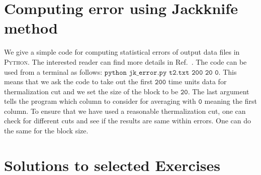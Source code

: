 \documentclass[letter,11pt]{article}
\newcommand{\PY}{\textsc{Python}}
\begin{document}
\section{\label{sec:jk_code}Computing error using Jackknife method}

We give a simple code for computing statistical errors of output data files in \PY. The interested reader can find more details in Ref.~\cite{2012arXiv1210.3781Y}. The code can be used from a terminal as follows: 
$\texttt{python jk\_error.py t2.txt 200 20 0}$. 
This means that we ask the code to take out the first $\texttt{200}$ time units data for thermalization cut and we set the size of the block to be $\texttt{20}$. The last argument tells the program which column to consider for averaging with $\texttt{0}$ meaning the first column. To ensure that we have used a reasonable thermalization cut, one can check for different cuts and see if the results 
are same within errors. One can do the same for the block size. 
	\begin{mdframed}[backgroundcolor=mauve!3] 
			
	\end{mdframed} 

\section{\label{sec:solutions}Solutions to selected Exercises} 
\end{document}
